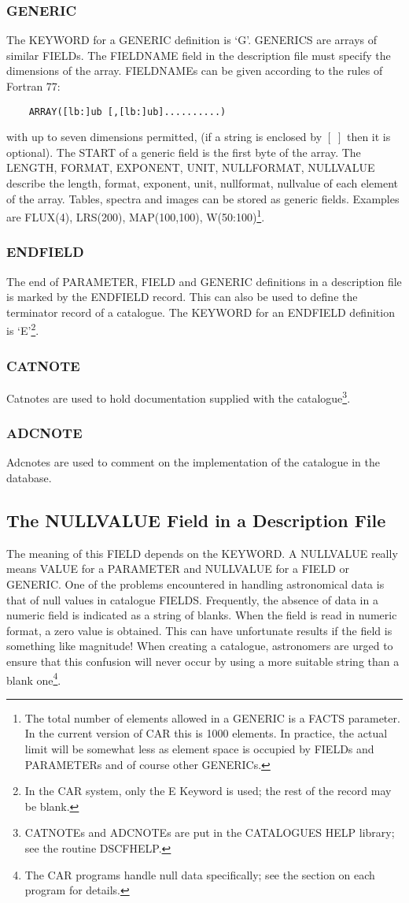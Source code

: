 \subsubsection {GENERIC}
The KEYWORD for a GENERIC definition is `G'.
GENERICS are arrays of similar FIELDs.
The FIELDNAME field in the description file must specify the dimensions of the
array.
FIELDNAMEs can be given according to the rules of Fortran 77:
\begin{verbatim}
    ARRAY([lb:]ub [,[lb:]ub]..........)
\end{verbatim}
with up to seven dimensions permitted, (if a string is enclosed by $[\;]$ then 
it is optional).
The START of a generic field is the first byte of the array.
The LENGTH, FORMAT, EXPONENT, UNIT, NULLFORMAT, NULLVALUE describe the length,
format, exponent, unit, nullformat, nullvalue of each element of the array.
Tables, spectra and images can be stored as generic fields.
Examples are FLUX(4), LRS(200), MAP(100,100), W(50:100)\footnote
{The total number of elements allowed in a GENERIC is a FACTS parameter.
In the current version of CAR this is 1000 elements.
In practice, the actual limit will be somewhat less as element space is occupied
by FIELDs and PARAMETERs and of course other GENERICs.}.
\subsubsection {ENDFIELD}
The end of PARAMETER, FIELD and GENERIC definitions in a description file
is marked by the ENDFIELD record.
This can also be used to define the terminator record of a catalogue.
The KEYWORD for an ENDFIELD definition is `E'\footnote
{In the CAR system, only the E Keyword is used; the rest of the record may be
blank.}.
\subsubsection {CATNOTE}
Catnotes are used to hold documentation supplied with the catalogue\footnote
{CATNOTEs and ADCNOTEs are put in the CATALOGUES HELP library; see the
routine DSCFHELP.}.
\subsubsection {ADCNOTE}
Adcnotes are used to comment on the implementation of the catalogue in the
database.
\subsection {The NULLVALUE Field in a Description File}
The meaning of this FIELD depends on the KEYWORD.
A NULLVALUE really means VALUE for a PARAMETER and NULLVALUE for a FIELD or
GENERIC.
One of the problems encountered in handling astronomical data is that of null
values in catalogue FIELDS.
Frequently, the absence of data in a numeric field is indicated as a string of
blanks.
When the field is read in numeric format, a zero value is obtained.
This can have unfortunate results if the field is something like magnitude!
When creating a catalogue, astronomers are urged to ensure that this confusion
will never occur by using a more suitable string than a blank one\footnote
{The CAR programs handle null data specifically; see the section on each
program for details.}.
